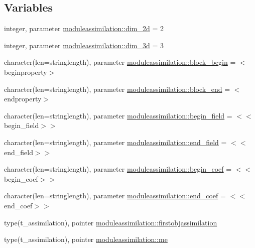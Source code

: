 \subsection*{Variables}
\begin{DoxyCompactItemize}
\item 
integer, parameter \mbox{\hyperlink{namespacemoduleassimilation_a34a9603a245a6727ce4bb588e23d6a1e}{moduleassimilation\+::dim\+\_\+2d}} = 2
\item 
integer, parameter \mbox{\hyperlink{namespacemoduleassimilation_afe612daf8dae0e1d9e9a616a4a7e0de3}{moduleassimilation\+::dim\+\_\+3d}} = 3
\item 
character(len=stringlength), parameter \mbox{\hyperlink{namespacemoduleassimilation_a499da09faa567dd1b80df1e7fa56474e}{moduleassimilation\+::block\+\_\+begin}} = \textquotesingle{}$<$beginproperty$>$\textquotesingle{}
\item 
character(len=stringlength), parameter \mbox{\hyperlink{namespacemoduleassimilation_a039648031db2c57e3be6056dfebfd3fd}{moduleassimilation\+::block\+\_\+end}} = \textquotesingle{}$<$endproperty$>$\textquotesingle{}
\item 
character(len=stringlength), parameter \mbox{\hyperlink{namespacemoduleassimilation_a753c8b8fc9c47fad51b9f7f9036be719}{moduleassimilation\+::begin\+\_\+field}} = \textquotesingle{}$<$$<$begin\+\_\+field$>$$>$\textquotesingle{}
\item 
character(len=stringlength), parameter \mbox{\hyperlink{namespacemoduleassimilation_a88cdda9c84dfaccb47eac5ddb047daf1}{moduleassimilation\+::end\+\_\+field}} = \textquotesingle{}$<$$<$end\+\_\+field$>$$>$\textquotesingle{}
\item 
character(len=stringlength), parameter \mbox{\hyperlink{namespacemoduleassimilation_a36b7146a3f9058e33923acb96c85e214}{moduleassimilation\+::begin\+\_\+coef}} = \textquotesingle{}$<$$<$begin\+\_\+coef$>$$>$\textquotesingle{}
\item 
character(len=stringlength), parameter \mbox{\hyperlink{namespacemoduleassimilation_a7b3120ad1932e896ddce3214175b5bfa}{moduleassimilation\+::end\+\_\+coef}} = \textquotesingle{}$<$$<$end\+\_\+coef$>$$>$\textquotesingle{}
\item 
type(t\+\_\+assimilation), pointer \mbox{\hyperlink{namespacemoduleassimilation_a692d23fc7e1fb188a3a3f25d685b2bc6}{moduleassimilation\+::firstobjassimilation}}
\item 
type(t\+\_\+assimilation), pointer \mbox{\hyperlink{namespacemoduleassimilation_a849747d57f21e4c2903903a340619bea}{moduleassimilation\+::me}}
\end{DoxyCompactItemize}
